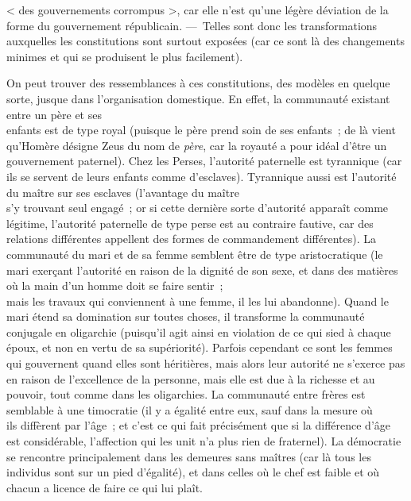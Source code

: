 \documentclass[french,twoside]{book} %
\begin{document}
< des gouvernements corrompus >, car elle n’est qu’une légère déviation de la forme du gouvernement républicain. — Telles sont donc les transformations auxquelles les constitutions sont surtout exposées (car ce sont là des changements minimes et qui se produisent le plus facilement).\par
On peut trouver des ressemblances à ces constitutions, des modèles en quelque sorte, jusque dans l’organisation domestique. En effet, la communauté existant entre un père et ses \\
enfants est de type royal (puisque le père prend soin de ses enfants ; de là vient qu’Homère désigne Zeus du nom de {\itshape père}, car la royauté a pour idéal d’être un gouvernement paternel). Chez les Perses, l’autorité paternelle est tyrannique (car ils se servent de leurs enfants comme d’esclaves). Tyrannique aussi est l’autorité du maître sur ses esclaves (l’avantage du maître \\
s’y trouvant seul engagé ; or si cette dernière sorte d’autorité apparaît comme légitime, l’autorité paternelle de type perse est au contraire fautive, car des relations différentes appellent des formes de commandement différentes). La communauté du mari et de sa femme semblent être de type aristocratique (le mari exerçant l’autorité en raison de la dignité de son sexe, et dans des matières où la main d’un homme doit se faire sentir ; \\
mais les travaux qui conviennent à une femme, il les lui abandonne). Quand le mari étend sa domination sur toutes choses, il transforme la communauté conjugale en oligarchie (puisqu’il  agit ainsi en violation de ce qui sied à chaque époux, et non en vertu de sa supériorité). Parfois cependant ce sont les femmes qui gouvernent quand elles sont héritières, mais alors leur autorité ne s’exerce pas en raison de l’excellence de la personne, mais elle est due à la richesse et au pouvoir, tout comme dans les oligarchies. La communauté entre frères est semblable à une timocratie (il y a égalité entre eux, sauf dans la mesure où \\
ils diffèrent par l’âge ; et c’est ce qui fait précisément que si la différence d’âge est considérable, l’affection qui les unit n’a plus rien de fraternel). La démocratie se rencontre principalement dans les demeures sans maîtres (car là tous les individus sont sur un pied d’égalité), et dans celles où le chef est faible et où chacun a licence de faire ce qui lui plaît.
\end{document}
